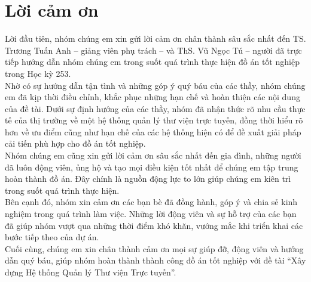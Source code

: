 \section*{Lời cảm ơn}
\thispagestyle{empty}

Lời đầu tiên, nhóm chúng em xin gửi lời cảm ơn chân thành sâu sắc nhất đến TS. Trương Tuấn Anh – giảng viên phụ trách – và ThS. Vũ Ngọc Tú – người đã trực tiếp hướng dẫn nhóm chúng em trong suốt quá trình thực hiện đồ án tốt nghiệp trong Học kỳ 253.\\
Nhờ có sự hướng dẫn tận tình và những góp ý quý báu của các thầy, nhóm chúng em đã kịp thời điều chỉnh, khắc phục những hạn chế và hoàn thiện các nội dung của đề tài. Dưới sự định hướng của các thầy, nhóm đã nhận thức rõ nhu cầu thực tế của thị trường về một hệ thống quản lý thư viện trực tuyến, đồng thời hiểu rõ hơn về ưu điểm cũng như hạn chế của các hệ thống hiện có để đề xuất giải pháp cải tiến phù hợp cho đồ án tốt nghiệp.\\
Nhóm chúng em cũng xin gửi lời cảm ơn sâu sắc nhất đến gia đình, những người đã luôn động viên, ủng hộ và tạo mọi điều kiện tốt nhất để chúng em tập trung hoàn thành đồ án. Đây chính là nguồn động lực to lớn giúp chúng em kiên trì trong suốt quá trình thực hiện.\\
Bên cạnh đó, nhóm xin cảm ơn các bạn bè đã đồng hành, góp ý và chia sẻ kinh nghiệm trong quá trình làm việc. Những lời động viên và sự hỗ trợ của các bạn đã giúp nhóm vượt qua những thời điểm khó khăn, vướng mắc khi triển khai các bước tiếp theo của dự án.\\
Cuối cùng, chúng em xin chân thành cảm ơn mọi sự giúp đỡ, động viên và hướng dẫn quý báu, giúp nhóm hoàn thành thành công đồ án tốt nghiệp với đề tài “Xây dựng Hệ thống Quản lý Thư viện Trực tuyến”.


\clearpage
{}

